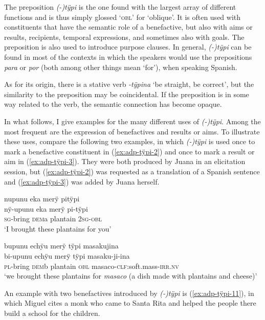 The preposition \textit{(-)tÿpi} is the one found with the largest array of different functions and is thus simply glossed ‘\textsc{obl}’ for ‘oblique’. It is often used with constituents that have the semantic role of a benefactive, but also with aims or results, recipients, temporal expressions, and sometimes also with goals. The preposition is also used to introduce purpose clauses. In general, \textit{(-)tÿpi} can be found in most of the contexts in which the speakers would use the prepositions \textit{para} or \textit{por} (both among other things mean ‘for’), when speaking Spanish.

As for its origin, there is a stative verb \textit{-tÿpina} ‘be straight, be correct’, but the similarity to the preposition may be coincidental. If the preposition is in some way related to the verb, the semantic connection has become opaque. 

In what follows, I give examples for the many different uses of \textit{(-)tÿpi}. Among the most frequent are the expression of benefactives and results or aims. To illustrate these uses, compare the following two examples, in which \textit{(-)tÿpi} is used once to mark a benefactive constituent in (\ref{ex:adp-tÿpi-2}) and once to mark a result or aim in (\ref{ex:adp-tÿpi-3}). They were both produced by Juana in an elicitation session, but (\ref{ex:adp-tÿpi-2}) was requested as a translation of a Spanish sentence and (\ref{ex:adp-tÿpi-3}) was added by Juana herself.

\ea\label{ex:adp-tÿpi-2}
\begingl
\glpreamble nupunu eka merÿ pitÿpi\\
\gla nÿ-upunu eka merÿ pi-tÿpi\\
\textsc{sg}-bring \textsc{dem}a plantain 2\textsc{sg}-\textsc{obl}\\
\glft ‘I brought these plantains for you’
\endgl
\trailingcitation{[jxx-e191021e-2]}
\xe

\ea\label{ex:adp-tÿpi-3}
\begingl
\glpreamble bupunu echÿu merÿ tÿpi masakujina\\
\gla bi-upunu echÿu merÿ tÿpi masaku-ji-ina\\
\textsc{pl}-bring \textsc{dem}b plantain \textsc{obl} masaco-\textsc{clf:}soft.mass-\textsc{irr.nv}\\
\glft ‘we brought these plantains for \textit{masaco} (a dish made with plantains and cheese)’
\endgl
\trailingcitation{[jxx-e191021e-2]}
\xe

An example with two benefactives introduced by \textit{(-)tÿpi} is (\ref{ex:adp-tÿpi-11}), in which Miguel cites a monk who came to Santa Rita and helped the people there build a school for the children.

